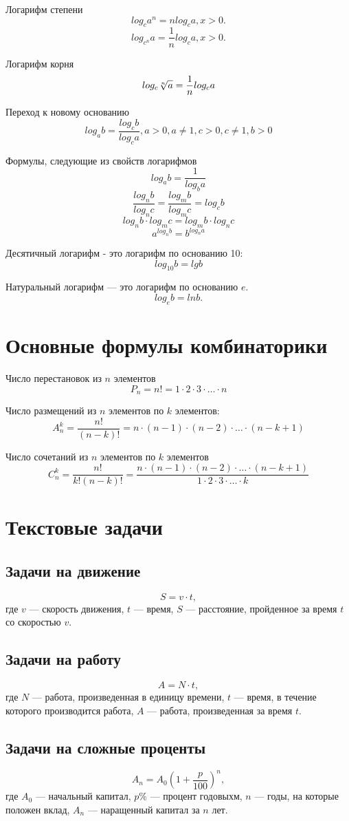 \documentclass[a4paper, 12pt]{article}
\begin{document}
Логарифм степени
$$log_ca^n=nlog_ca, x>0.$$
$$log_{c^n}a=\frac{1}{n}log_ca, x>0.$$

Логарифм корня
$$log_c \root{n}\of{a}=\frac{1}{n}log_ca$$

Переход к новому основанию
$$log_ab=\frac{log_cb}{log_ca}, a>0, a\not=1, c>0, c\not=1, b>0$$

Формулы, следующие из свойств логарифмов
$$log_ab=\frac{1}{log_ba}$$
$$\frac{log_nb}{log_nc}=\frac{log_mb}{log_mc}=log_cb$$
$$log_nb\cdot log_mc=log_mb\cdot log_nc$$
$$a^{log_nb}=b^{log_na}$$

Десятичный логарифм - это логарифм по основанию 10:
$$log_{10}b=lgb$$

Натуральный логарифм --- это логарифм по основанию $e.$
$$log_eb=ln b.$$

\section{Основные формулы комбинаторики}

Число перестановок из $n$ элементов 
$$P_n=n!=1\cdot 2\cdot 3\cdot \dots \cdot n$$

Число размещений из $n$ элементов по $k$ элементов:
$$A_n^k=\frac{n!}{(n-k)!}=n\cdot (n-1)\cdot (n-2)\cdot \dots \cdot (n-k+1)$$

Число сочетаний из $n$ элементов по $k$ элементов
$$C_n^k=\frac{n!}{k!(n-k)!}=\frac{n\cdot (n-1)\cdot (n-2)\cdot \dots \cdot (n-k+1)}{1\cdot 2\cdot 3\cdot \dots \cdot k}$$

\section{Текстовые задачи}
\subsection{Задачи на движение}
$$S=v\cdot t,$$
где $v$ --- скорость движения, $t$ --- время, $S$ --- расстояние, пройденное за время $t$ со скоростью $v.$
\subsection{Задачи на работу}
$$A=N\cdot t,$$
где $N$ --- работа, произведенная в единицу времени, $t$ --- время, в течение которого производится работа, $A$ --- работа, произведенная за время $t.$
\subsection{Задачи на сложные проценты}
$$A_n=A_0\left( 1+\frac{p}{100}\right)^n ,$$
где $A_0$ --- начальный капитал, $p\%$ --- процент годовыхм, $n$ --- годы, на которые положен вклад, $A_n$ --- наращенный капитал за $n$ лет. 
\end{document}
